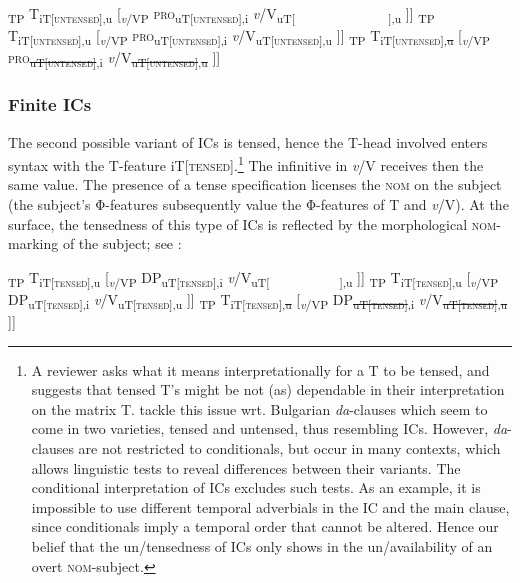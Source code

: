 \documentclass[output=paper,colorlinks,citecolor=brown,
modfonts,newtxmath
]{langscibook}
\begin{document}
\ea\label{ex:nonfinite}
\ea {[}\textsubscript{TP} T\textsubscript{iT[\textsc{untensed}],u\textPhi[~~]} [\textsubscript{\textit{v}/VP} \textsc{pro}\textsubscript{uT[\textsc{untensed}],i\textPhi[~~~]} \textit{v}/V\textsubscript{uT[~~~~~~~~~~~~~~~~],u\textPhi[~~~]} ]] 
\ex {[}\textsubscript{TP} T\textsubscript{iT[\textsc{untensed}],u\textPhi[Φ]} [\textsubscript{\textit{v}/VP} \textsc{pro}\textsubscript{uT[\textsc{untensed}],i\textPhi[Φ]} \textit{v}/V\textsubscript{uT[\textsc{untensed}],u\textPhi[Φ]} ]] 
\ex {[}\textsubscript{TP} T\textsubscript{iT[\textsc{untensed}],\sout{u\textPhi[Φ]}} [\textsubscript{\textit{v}/VP} \textsc{pro}\textsubscript{\sout{uT[\textsc{untensed}]},i\textPhi[Φ]} \textit{v}/V\textsubscript{\sout{uT[\textsc{untensed}]},\sout{u\textPhi[Φ]}} ]] 
\z
\z


\subsubsection{Finite ICs}\label{sec:nom_proposal_finite}

The second possible variant of ICs is tensed, hence the T-head involved enters syntax with the T-feature iT[\textsc{tensed}].\footnote{A reviewer asks what it means interpretationally for a T to be tensed, and suggests that tensed T's might be not (as) dependable in their interpretation on the matrix T. \citet{KrapovaPetkov1999} tackle this issue wrt. Bulgarian \textit{da}-clauses which seem to come in two varieties, tensed and untensed, thus resembling ICs. However, \textit{da}-clauses are not restricted to conditionals, but occur in many contexts, which allows linguistic tests to reveal differences between their variants. The conditional interpretation of ICs excludes such tests. As an example, it is impossible to use different temporal adverbials in the IC and the main clause, since conditionals imply a temporal order that cannot be altered. Hence our belief that the un/tensedness of ICs only shows in the un/availability of an overt \textsc{nom}-subject.} The infinitive in \textit{v}/V receives then the same value. The presence of a tense specification licenses the \textsc{nom} on the subject (the subject's Φ-features subsequently value the Φ-features of T and \textit{v}/V). At the surface, the tensedness of this type of ICs is reflected by the morphological \textsc{nom}-marking of the subject; see :

\ea\label{ex:finite}
\ea {[}\textsubscript{TP} T\textsubscript{iT[\textsc{tensed}],u\textPhi[~~]} [\textsubscript{\textit{v}/VP} DP\textsubscript{uT[\textsc{tensed}],i\textPhi[Φ]} \textit{v}/V\textsubscript{uT[~~~~~~~~~~~~],u\textPhi[~~~]} ]]
\ex {[}\textsubscript{TP} T\textsubscript{iT[\textsc{tensed}],u\textPhi[Φ]} [\textsubscript{\textit{v}/VP} DP\textsubscript{uT[\textsc{tensed}],i\textPhi[Φ]} \textit{v}/V\textsubscript{uT[\textsc{tensed}],u\textPhi[Φ]} ]] 
\ex {[}\textsubscript{TP} T\textsubscript{iT[\textsc{tensed}],\sout{u\textPhi[Φ]}} [\textsubscript{\textit{v}/VP} DP\textsubscript{\sout{uT[\textsc{tensed}]},i\textPhi[Φ]} \textit{v}/V\textsubscript{\sout{uT[\textsc{tensed}]},\sout{u\textPhi[Φ]}} ]] 
\z
\z
\end{document}
